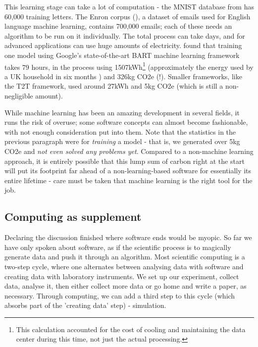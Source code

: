 \documentclass{article}
\begin{document}
This learning stage can take a lot of computation - the MNIST database from \citet{deng2012mnist} has 60,000 training letters. The Enron corpus (\citet[see][]{klimt2004enron}), a dataset of emails used for English language machine learning, contains 700,000 emails; each of these needs an algorithm to be run on it individually. The total process can take days, and for advanced applications can use  huge amounts of electricity. \citet{strubell2019energy} found that training one model using Google's state-of-the-art BART machine learning framework takes 79 hours, in the process using 1507kWh\footnote{This calculation accounted for the cost of cooling and maintaining the data center during this time, not just the actual processing.} (approximately the energy used by a UK household in six months \citep{waters2019energy}) and 326kg CO2e (!). Smaller frameworks, like the T2T framework, used around 27kWh and 5kg CO2e (which is still a non-negligible amount). \newline

While machine learning has been an amazing development in several fields, it runs the risk of overuse; some software concepts can almost become fashionable, with not enough consideration put into them. Note that the statistics in the previous paragraph were for \emph{training} a model - that is, we generated over 5kg CO2e and \emph{not even solved any problems yet}. Compared to a non-machine learning approach, it is entirely possible that this lump sum of carbon right at the start will put its footprint far ahead of a non-learning-based software for essentially its entire lifetime - care must be taken that machine learning is the right tool for the job.


\subsection{Computing as supplement}
Declaring the discussion finished where software ends would be myopic. So far we have only spoken about software, as if the scientific process is to magically generate data and push it through an algorithm. Most scientific computing is a two-step cycle, where one alternates between analysing data with software and creating data with laboratory instruments. We set up our experiment, collect data, analyse it, then either collect more data or go home and write a paper, as necessary. Through computing, we can add a third step to this cycle (which absorbs part of the 'creating data' step) - simulation. \newline
\end{document}

